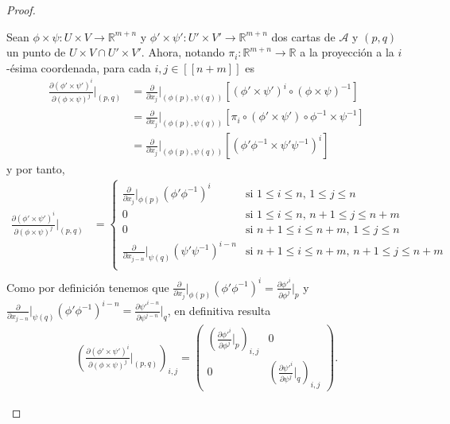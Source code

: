 \documentclass[11pt]{article}
\newcommand{\R}{\mathbb{R}}
\newcommand{\nat}[1]{[\![#1]\!]}
\begin{document}
\begin{proof}
\begin{itemize}[listparindent = \parindent]
Sean $\phi \times \psi : U \times V \to \R^{m+n}$ y $\phi' \times \psi': U' \times V' \to \R^{m+n}$ dos cartas de $\mathcal{A}$ y $(p,q)$ un punto de  $U \times V \cap U' \times V'$. Ahora, notando $\pi_i : \R^{m+n} \to \R$ a la proyección a la $i$-ésima coordenada, para cada $i,j \in \nat{n+m}$ es
\begin{align*}
\frac{\partial (\phi' \times \psi')^i}{\partial (\phi \times \psi)^j}\Big|_{(p,q)} &= \frac{\partial }{\partial x_j}\Big|_{(\phi(p),\psi(q))}[(\phi' \times \psi')^i \circ (\phi \times \psi)^{-1}]\\
&= \frac{\partial }{\partial x_j}\Big|_{(\phi(p),\psi(q))}[\pi_i \circ (\phi' \times \psi') \circ \phi^{-1} \times \psi^{-1}]\\
&= \frac{\partial }{\partial x_j}\Big|_{(\phi(p),\psi(q))}[(\phi'\phi^{-1} \times \psi'\psi^{-1})^i] 
\end{align*}
y por tanto,
\begin{align*}
\frac{\partial (\phi' \times \psi')^i}{\partial (\phi \times \psi)^j}\Big|_{(p,q)} &= \begin{cases}
\frac{\partial }{\partial x_j}|_{\phi(p)}(\phi'\phi^{-1})^i&\text{si $1 \leq i \leq n$, $1 \leq j \leq n$ }\\
0 &\text{si $1 \leq i \leq n$, $n+1 \leq j \leq n+m$ }\\
0 &\text{si $n+1 \leq i \leq n+m$, $1 \leq j \leq n$ }\\
\frac{\partial }{\partial x_{j-n}}|_{\psi(q)}(\psi'\psi^{-1})^{i-n}&\text{si $n+1 \leq i \leq n+m$, $n+1 \leq j \leq n+m$ }\\
\end{cases}\\
\end{align*}
Como por definición tenemos que $\frac{\partial }{\partial x_j}\Big|_{\phi(p)}(\phi'\phi^{-1})^i = \frac{\partial {\phi'}^i}{\partial \phi^j}\Big|_p$ y $\frac{\partial }{\partial x_{j-n}}\Big|_{\psi(q)}(\phi'\phi^{-1})^{i-n} = \frac{\partial {\psi'}^{i-n}}{\partial \psi^{j-n}}\Big|_q$, en definitiva resulta
\begin{align*}
\left(\frac{\partial (\phi' \times \psi')^i}{\partial (\phi \times \psi)^j}\Big|_{(p,q)}\right)_{i,j} = \begin{pmatrix}
\left(\frac{\partial {\phi'}^i}{\partial \phi^j}\Big|_p\right)_{i,j} & 0\\
0 & \left(\frac{\partial {\psi'}^{i}}{\partial \psi^{j}}\Big|_q\right)_{i,j}
\end{pmatrix}.
\end{align*}


\end{itemize}
\end{proof}
\end{document}
